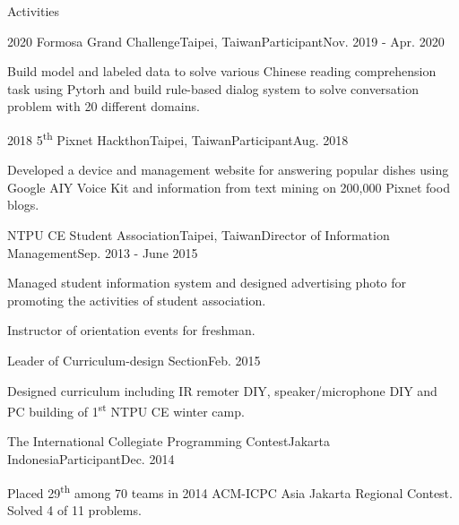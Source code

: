 \documentclass{resume} %
\newcommand{\ts}{\textsuperscript}
\begin{document}
\begin{rSection}{Activities}
    \begin{rSubsection}{2020 Formosa Grand Challenge}{Taipei, Taiwan}{Participant}{Nov. 2019 - Apr. 2020}
        \item Build model and labeled data to solve various Chinese reading comprehension task using Pytorh 
        and build rule-based dialog system to solve conversation problem with 20 different domains.
    \end{rSubsection}
    \begin{rSubsection}{2018 5\ts{th} Pixnet Hackthon}{Taipei, Taiwan}{Participant}{Aug. 2018}
        \item Developed a device and management website for answering popular dishes using Google AIY Voice Kit and information from text mining on 200,000 Pixnet food blogs.
    \end{rSubsection}
    \begin{rSubsection}{NTPU CE Student Association}{Taipei, Taiwan}{Director of Information Management}{Sep. 2013 - June 2015}
        \item Managed student information system and designed advertising photo for promoting the activities of student association.
        \item Instructor of orientation events for freshman.
    \end{rSubsection}
    \begin{rSubsection2}{Leader of Curriculum-design Section}{Feb. 2015}
        \item Designed curriculum including IR remoter DIY, speaker/microphone DIY and PC building of 1\ts{st} NTPU CE winter camp.
    \end{rSubsection2}
    \begin{rSubsection}{The International Collegiate Programming Contest}{Jakarta Indonesia}{Participant}{Dec. 2014}
        \item Placed 29\ts{th} among 70 teams in 2014 ACM-ICPC Asia Jakarta Regional Contest. Solved 4 of 11 problems.
    \end{rSubsection}
\end{rSection}

\end{document}
